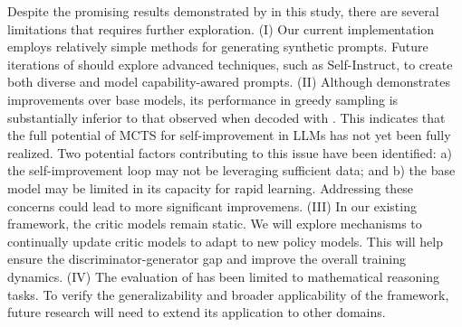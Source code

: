 Despite the promising results demonstrated by \model{} in this study, there are several limitations that requires further exploration. (\RN{1}) Our current implementation employs relatively simple methods for generating synthetic prompts. Future iterations of \model{} should explore advanced techniques, such as Self-Instruct, to create both diverse and model capability-awared prompts. (\RN{2}) Although \model{} demonstrates improvements over base models, its performance in greedy sampling is substantially inferior to that observed when decoded with \emcts{}. This indicates that the full potential of MCTS for self-improvement in LLMs has not yet been fully realized. Two potential factors contributing to this issue have been identified: a) the self-improvement loop may not be leveraging sufficient data; and b) the base model may be limited in its capacity for rapid learning. Addressing these concerns could lead to more significant improvemens. (\RN{3}) In our existing framework, the critic models remain static. We will explore mechanisms to continually update critic models to adapt to new policy models. This will help ensure the discriminator-generator gap and improve the overall training dynamics. (\RN{4}) The evaluation of \model{} has been limited to mathematical reasoning tasks. To verify the generalizability and broader applicability of the framework, future research will need to extend its application to other domains.